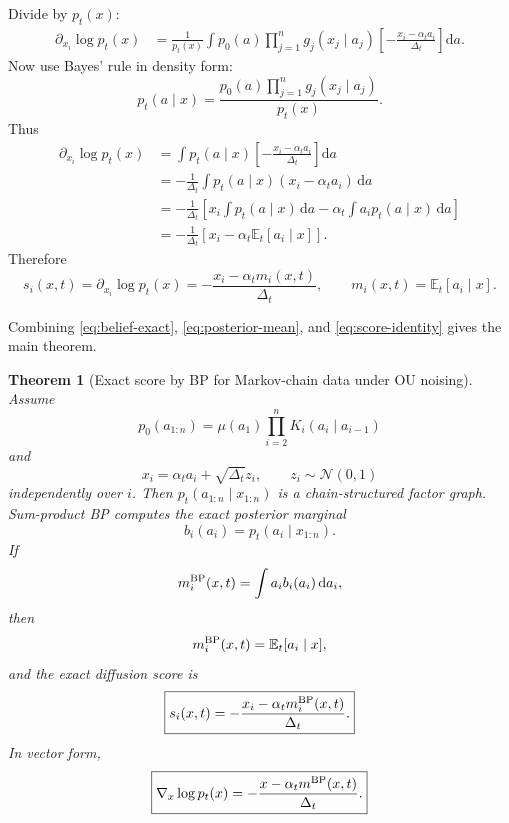 \documentclass[11pt]{article}
\newtheorem{theorem}{Theorem}
\newcommand{\E}{\mathbb{E}}
\newcommand{\Normal}{\mathcal{N}}
\begin{document}
Divide by \(p_t(x)\):
\begin{align}
  \partial_{x_i}\log p_t(x)
  &= \frac{1}{p_t(x)}
  \int p_0(a)
  \prod_{j=1}^n g_j(x_j\mid a_j)
  \left[-\frac{x_i-\alpha_t a_i}{\Delta_t}\right]
  \mathrm{d}a.
\end{align}
Now use Bayes' rule in density form:
\begin{equation}
  p_t(a\mid x)
  = \frac{p_0(a)\prod_{j=1}^n g_j(x_j\mid a_j)}{p_t(x)}.
\end{equation}
Thus
\begin{align}
  \partial_{x_i}\log p_t(x)
  &= \int p_t(a\mid x)
  \left[-\frac{x_i-\alpha_t a_i}{\Delta_t}\right]
  \mathrm{d}a \\
  &= -\frac{1}{\Delta_t}
  \int p_t(a\mid x)(x_i-\alpha_t a_i)\,\mathrm{d}a \\
  &= -\frac{1}{\Delta_t}
  \left[
    x_i\int p_t(a\mid x)\,\mathrm{d}a
    -\alpha_t\int a_i p_t(a\mid x)\,\mathrm{d}a
  \right] \\
  &= -\frac{1}{\Delta_t}
  \left[x_i -\alpha_t\E_t[a_i\mid x]\right].
\end{align}
Therefore
\begin{equation}
  \boxed{
  s_i(x,t)
  = \partial_{x_i}\log p_t(x)
  = -\frac{x_i-\alpha_t m_i(x,t)}{\Delta_t},
  \qquad m_i(x,t)=\E_t[a_i\mid x].
  }
  \label{eq:score-identity}
\end{equation}

Combining \eqref{eq:belief-exact}, \eqref{eq:posterior-mean}, and \eqref{eq:score-identity} gives the main theorem.

\begin{theorem}[Exact score by BP for Markov-chain data under OU noising]
Assume
\[
  p_0(a_{1:n})=\mu(a_1)\prod_{i=2}^n K_i(a_i\mid a_{i-1})
\]
and
\[
  x_i=\alpha_t a_i+\sqrt{\Delta_t}z_i,
  \qquad z_i\sim\Normal(0,1)
\]
independently over \(i\). Then \(p_t(a_{1:n}\mid x_{1:n})\) is a chain-structured factor graph. Sum-product BP computes the exact posterior marginal
\[
  b_i(a_i)=p_t(a_i\mid x_{1:n}).
\]
If
\[
  m_i^{\rm BP}(x,t)=\int a_i b_i(a_i)\,\mathrm{d}a_i,
\]
then
\[
  m_i^{\rm BP}(x,t)=\E_t[a_i\mid x],
\]
and the exact diffusion score is
\begin{equation}
  \boxed{
  s_i(x,t)= -\frac{x_i-\alpha_t m_i^{\rm BP}(x,t)}{\Delta_t}.
  }
\end{equation}
In vector form,
\begin{equation}
  \boxed{
  \nabla_x\log p_t(x)=-\frac{x-\alpha_t m^{\rm BP}(x,t)}{\Delta_t}.
  }
\end{equation}
\end{theorem}
\end{document}
